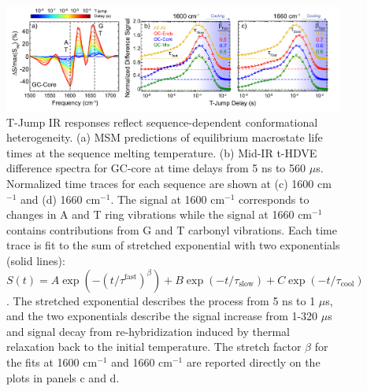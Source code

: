 \documentclass[journal=jpcbfk,manuscript=article]{achemso}
\begin{document}
\begin{figure}[ht!]
	\begin{center} 
        \includegraphics[width=1.0\textwidth]{Fig5.pdf}
        \caption{T-Jump IR responses reflect sequence-dependent conformational heterogeneity. (a) MSM predictions of equilibrium macrostate life times at the sequence melting temperature. (b) Mid-IR t-HDVE difference spectra for GC-core at time delays from 5 ns to 560 $\mu$s. Normalized time traces for each sequence are shown at (c) 1600 cm$^{-1}$ and (d) 1660 cm$^{-1}$. The signal at 1600 cm$^{-1}$ corresponds to changes in A and T ring vibrations while the signal at 1660 cm$^{-1}$ contains contributions from G and T carbonyl vibrations. Each time trace is fit to the sum of stretched exponential with two exponentials (solid lines): $S(t) = A\exp{(-(t/\tau^{\mathrm{fast}})^{\beta})} + B\exp{(-t/\tau_{\mathrm{slow}})}+C\exp{(-t/\tau_{\mathrm{cool}})}$. The stretched exponential describes the process from 5 ns to 1 $\mu$s, and the two exponentials describe the signal increase from 1-320 $\mu$s and signal decay from re-hybridization induced by thermal relaxation back to the initial temperature. The stretch factor $\beta$ for the fits at 1600 cm$^{-1}$ and 1660 cm$^{-1}$ are reported directly on the plots in panels c and d.
        }
        \label{fig:T-jump_stretching}
	\end{center}
\end{figure}

   
   
   

\end{document}
